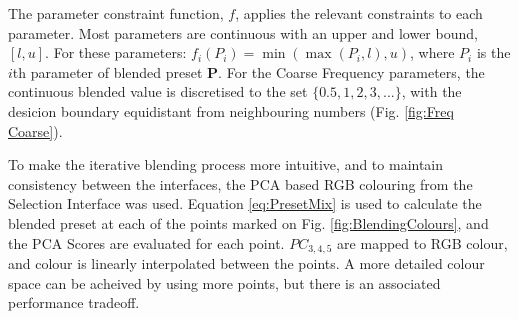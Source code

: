 \documentclass[11pt, oneside]{report}   	%
\renewcommand{\vec}[1]{\mathbf{#1}}
\begin{document}
The parameter constraint function, $f$, applies the relevant constraints to each parameter. Most parameters are continuous with an upper and lower bound, $[l, u]$. For these parameters: $f_i(P_i) = \min(\max(P_i, l), u)$, where $P_i$ is the $i$th parameter of blended preset $\vec{P}$. For the Coarse Frequency parameters, the continuous blended value is discretised to the set $\{0.5, 1, 2, 3, ...\}$, with the desicion boundary equidistant from neighbouring numbers (Fig. \ref{fig:Freq Coarse}).

To make the iterative blending process more intuitive, and to maintain consistency between the interfaces, the PCA based RGB colouring from the Selection Interface was used. Equation \ref{eq:PresetMix} is used to calculate the blended preset at each of the points marked on Fig. \ref{fig:BlendingColours}, and the PCA Scores are evaluated for each point. $PC_{3,4,5}$ are mapped to RGB colour, and colour is linearly interpolated between the points. A more detailed colour space can be acheived by using more points, but there is an associated performance tradeoff. 
\end{document}
